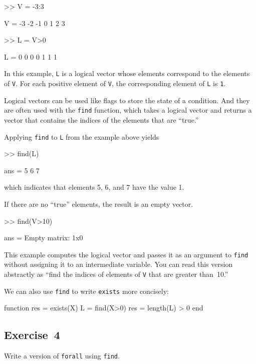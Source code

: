 
\begin{code}
>> V = -3:3

V = -3    -2    -1     0     1     2     3

>> L = V>0

L =  0     0     0     0     1     1     1
\end{code}

In this example, \lstinline{L} is a logical vector whose elements
correspond to the elements of \lstinline{V}.  For each positive element of
\lstinline{V}, the corresponding element of \lstinline{L} is \lstinline{1}.

Logical vectors can be used like flags to store the state of
a condition.  And they are often used with the \lstinline{find} function,
which takes a logical vector and returns a vector that contains
the indices of the elements that are ``true.''


Applying \lstinline{find} to \lstinline{L} from the example above yields

\begin{code}
>> find(L)

ans = 5     6     7
\end{code}
which indicates that elements 5, 6, and 7 have the value 1.

If there are no ``true'' elements, the result is an empty vector.

\begin{code}
>> find(V>10)

ans = Empty matrix: 1x0
\end{code}

This example computes the logical vector and passes it as an
argument to \lstinline{find} without assigning it to an intermediate
variable.  You can read this version abstractly as ``find
the indices of elements of \lstinline{V} that are greater than~10.''

We can also use \lstinline{find} to write \lstinline{exists} more concisely:

\begin{code}
function res = exists(X)
    L = find(X>0)
    res = length(L) > 0
end
\end{code}

\subsection{Exercise~4}
Write a version of \lstinline{forall} using \lstinline{find}.


